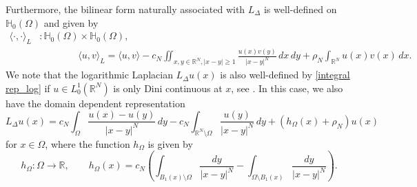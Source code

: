 \documentclass[notitlepage,11pt,reqno]{amsart}
\theoremstyle{definition}
\numberwithin{equation}{section}
\newcommand{\RR}{\mathds{R}}
\begin{document}
\noindent Furthermore, the bilinear form naturally associated with $L_{\Delta}$ is well-defined on $\mathbb{H}_0(\Omega)$ and given by
\begin{align*}
    \langle \cdot,\cdot \rangle_L&: \mathbb{H}_0(\Omega)\times \mathbb{H}_0(\Omega),\\
    &\qquad \qquad \langle u, v \rangle_L=\langle u,v \rangle-c_N \iint_{x, y \in \RR^N,  |x-y|\geq 1} \frac{u(x)v(y)}{|x-y|^N}\,dx\, dy+\rho_N\int_{\RR^N}u(x)v(x)\, dx.
\end{align*}
We note that the logarithmic Laplacian $L_{\Delta}u(x)$ is also well-defined by \eqref{integral rep_log} if $u\in L^1_0(\RR^N)$ is only Dini continuous at $x$, see \cite[Proposition 2.2]{CW19}. In this case, we also have the domain dependent representation
\begin{equation}\label{alt_integral rep_log}
L_{\Delta}u(x)=c_N \int_{\Omega}\frac{u(x)-u(y)}{|x-y|^N}\, dy-c_N\int_{\RR^N\setminus \Omega}\frac{u(y)}{|x-y|^{N}}\, dy+\left(h_{\Omega}(x)+\rho_N\right) u(x)    
\end{equation}
for $x\in \Omega$, where the function $h_{\Omega}$ is given by
\begin{equation}
  \label{def-h-Omega}
    h_{\Omega}: \Omega \to \RR,\qquad h_{\Omega}(x)=c_N \left(\int_{B_1(x)\setminus \Omega}\frac{dy}{|x-y|^N}-\int_{\Omega\setminus B_1(x)}\frac{dy}{|x-y|^N}\right).
\end{equation}
\end{document}
